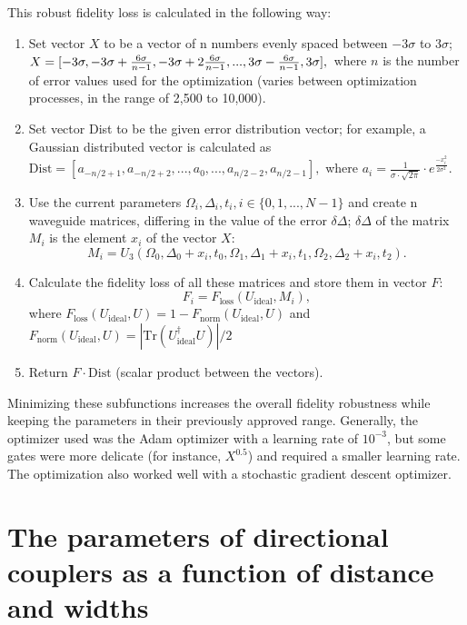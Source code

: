 \documentclass[floatfix,reprint, amsmath,amssymb,aps,superscriptaddress,nofootinbib]{revtex4-2}
\begin{document}
This robust fidelity loss is calculated in the following way:
\begin{enumerate}
    \item Set vector $X$ to be a vector of n numbers evenly spaced between $-3\sigma$ to $3\sigma$; $X=[-3\sigma,-3\sigma+\frac{6\sigma}{n-1},-3\sigma+2\frac{6\sigma}{n-1},...,3\sigma-\frac{6\sigma}{n-1},3\sigma], \\$ 
    where $n$ is the number of error values used for the optimization (varies between optimization processes, in the range of 2,500 to 10,000). 
    
    \item Set vector Dist to be the given error distribution vector; for example, a Gaussian distributed vector is calculated as
$\mathrm{Dist} =[a_{-n/2+1},a_{-n/2+2},...,a_0,...,a_{n/2-2},a_{n/2-1}],$ where
$a_i = \frac{1}{\sigma \cdot \sqrt{2\pi}} \cdot e^{\frac{-x_i^2}{2\sigma^2}}$.

    \item Use the current parameters $\Omega_i,\Delta_i,t_i, i \in \{0,1,...,N-1\}$ and create n waveguide matrices, differing in the value of the error $\delta\Delta$; $\delta\Delta$ of the matrix $M_i$ is the element $x_i$ of the vector $X$: $$M_i=U_{3}(\Omega_0,\Delta_0+x_i,t_0,
          \Omega_1,\Delta_1+x_i,t_1,
          \Omega_2,\Delta_2+x_i,t_2).$$
          
    \item Calculate the fidelity loss of all these matrices and store them in vector $F$:
$$F_i = F_\mathrm{loss}(U_\mathrm{ideal},M_i),$$
where $F_\mathrm{loss}(U_\mathrm{ideal},U)= 1 - F_\mathrm{norm}(U_\mathrm{ideal},U)$
and $F_\mathrm{norm}(U_\mathrm{ideal},U)= |\mathrm{Tr}(U_\mathrm{ideal}^{\dagger}U)|/2 $
    \item  Return $F \cdot \mathrm{Dist}$ (scalar product between the vectors).
\end{enumerate}

Minimizing these subfunctions increases the overall fidelity robustness while keeping the parameters in their previously approved range. Generally, the optimizer used was the Adam optimizer with a learning rate of $10^{-3}$, but some gates were more delicate (for instance, $X^{0.5}$) and required a smaller learning rate. The optimization also worked well with a stochastic gradient descent optimizer.



\section{The parameters of directional couplers as a function of distance and widths\label{appendix: Fit}}
\end{document}
